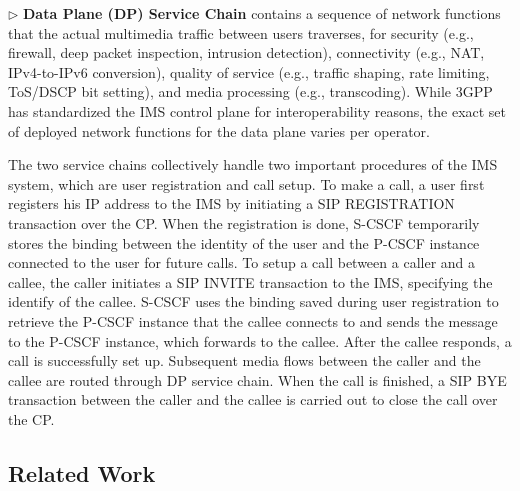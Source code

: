 $\triangleright$ \noindent\textbf{Data Plane (DP) Service Chain} contains a sequence of network functions that the actual multimedia traffic between users traverses, for security (e.g., firewall, deep packet inspection, intrusion detection), connectivity (e.g., NAT, IPv4-to-IPv6 conversion), quality of service (e.g., traffic shaping, rate limiting, ToS/DSCP bit setting), and media processing (e.g., transcoding). While 3GPP has standardized the IMS control plane for interoperability reasons, the exact set of deployed network functions for the data plane varies per operator.


The two service chains collectively handle two important procedures of the IMS system, which are user registration and call setup. %
To make a call, a user first registers his IP address to the IMS by initiating a SIP REGISTRATION transaction over the CP. When the registration is done, S-CSCF temporarily stores the binding between the identity of the user and the P-CSCF instance connected to the user for future calls. To setup a call between a caller and a callee, the caller initiates a SIP INVITE transaction to the IMS, specifying the identify of the callee. S-CSCF uses the binding saved during user registration to retrieve the P-CSCF instance that the callee connects to and sends the message to the P-CSCF instance, which forwards to the callee. After the callee responds, a call is successfully set up. Subsequent media flows between the caller and the callee are routed through DP service chain. When the call is finished, a SIP BYE transaction between the caller and the callee is carried out to close the call over the CP.


\subsection{Related Work}


